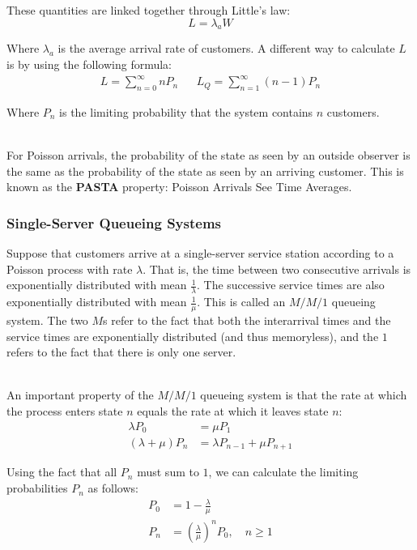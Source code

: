 \documentclass[12pt]{article}
\begin{document}
\noindent
These quantities are linked together through Little's law:
\[ L = \lambda_a W \]

\noindent
Where $\lambda_a$ is the average arrival rate of customers.
A different way to calculate $L$ is by using the following formula:
\begin{align*}
    L = \sum_{n = 0}^\infty n P_n && L_Q = \sum_{n = 1}^\infty (n - 1) P_n
\end{align*}

\noindent
Where $P_n$ is the limiting probability that the system contains $n$ customers.

\noindent
\\
For Poisson arrivals, the probability of the state as seen by an outside observer is the same as the probability of the state as seen by an arriving customer.
This is known as the \textbf{PASTA} property: Poisson Arrivals See Time Averages.

\subsubsection{Single-Server Queueing Systems}
Suppose that customers arrive at a single-server service station according to a Poisson process with rate $\lambda$.
That is, the time between two consecutive arrivals is exponentially distributed with mean $\frac{1}{\lambda}$.
The successive service times are also exponentially distributed with mean $\frac{1}{\mu}$.
This is called an $M/M/1$ queueing system.
The two $M$s refer to the fact that both the interarrival times and the service times are exponentially distributed (and thus memoryless), and the $1$ refers to the fact that there is only one server.

\noindent
\\
An important property of the $M/M/1$ queueing system is that the rate at which the process enters state $n$ equals the rate at which it leaves state $n$:
\begin{align*}
    \lambda P_0 &= \mu P_1 \\
    (\lambda + \mu)P_n &= \lambda P_{n - 1} + \mu P_{n + 1}
\end{align*}

\noindent
Using the fact that all $P_n$ must sum to $1$, we can calculate the limiting probabilities $P_n$ as follows:
\begin{align*}
    P_0 &= 1 - \frac{\lambda}{\mu} \\
    P_n &= \left( \frac{\lambda}{\mu} \right)^n P_0, \quad n \geq 1
\end{align*}
\end{document}
